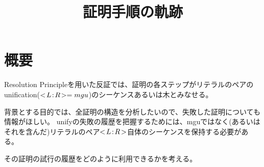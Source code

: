 \documentclass[10pt, onecolumn]{jarticle}   	%
\title{証明手順の軌跡}
\author{\myname}
\date{}					%
\begin{document}
\maketitle

\section{概要}
Resolution Principleを用いた反証では、証明の各ステップがリテラルのペアのunification($<\!L\!:\!R\!>=mgu$)のシーケンスあるいは木とみなせる。

背景とする目的では、全証明の構造を分析したいので、失敗した証明についても情報がほしい。
unifyの失敗の履歴を把握するためには、mguではなく(あるいはそれを含んだ)リテラルのペア$<\!L\!:\!R\!>$自体のシーケンスを保持する必要がある。

その証明の試行の履歴をどのように利用できるかを考える。

\end{document}
